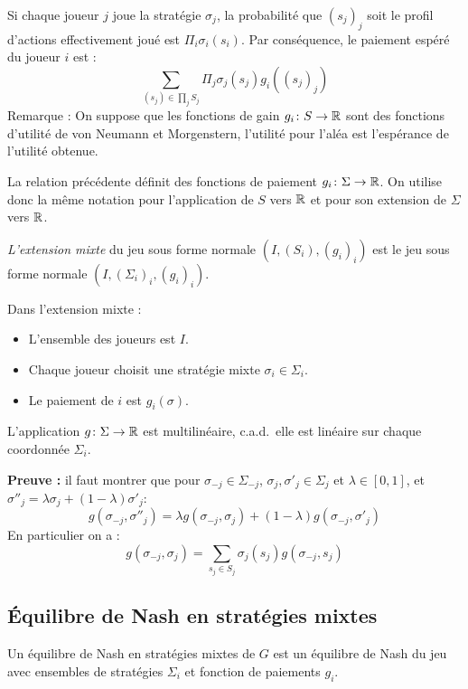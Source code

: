 Si chaque joueur $j$ joue la strat\'egie $\sigma_j$, la
probabilité que $(s_j)_j$ soit le profil d'actions effectivement
joué est $\Pi_i \sigma_i(s_i)$. Par conséquence, le paiement
esp\'er\'e du joueur $i$ est :
$$
\sum_{(s_j)\in \prod_j S_j} \Pi_j \sigma_j(s_j) g_i((s_j)_j)
$$
Remarque : On suppose que les fonctions de gain $g_i\colon
S\to\mathbb R$ sont des fonctions d'utilité de von Neumann et
Morgenstern, l'utilité pour l'aléa est l'espérance de l'utilité
obtenue.

La relation précédente définit des fonctions de paiement
$g_i\colon\Sigma\to\mathbb R$. On utilise donc la même notation pour
l'application de $S$ vers $\mathbb R$ et pour son extension de
$\Sigma$ vers $\mathbb R$.

\begin{definition}
{\em L'extension mixte} du jeu sous forme normale $(I,
(S_i),(g_i)_i)$ est le jeu sous forme normale
$(I,(\Sigma_i)_i,(g_i)_i)$.%
\end{definition}

Dans l'extension mixte :
\begin{itemize}%
\item L'ensemble des joueurs est $I$.%
\item Chaque joueur choisit une stratégie mixte $\sigma_i\in
\Sigma_i$. %
\item Le paiement de $i$ est $g_i(\sigma)$.%
\end{itemize}%


\begin{proposition} L'application $g\colon\Sigma\to\mathbb R$ est multilin\'eaire,
c.a.d.\, elle est lin\'eaire sur chaque coordonn\'ee $\Sigma_i$.
\end{proposition}
{\bf Preuve :} il faut montrer que pour
$\sigma_{-j}\in\Sigma_{-j}$, $\sigma_j, \sigma'_j \in \Sigma_j$ et
$\lambda\in[0,1]$, et $\sigma''_j=\lambda \sigma_j + (1-\lambda)
\sigma'_j$:
$$
g(\sigma_{-j},\sigma''_{j}) = \lambda g(\sigma_{-j},\sigma_{j}) +
(1-\lambda)g(\sigma_{-j},\sigma'_{j})
$$
En particulier on a :
$$
g(\sigma_{-j},\sigma_{j}) = \sum_{s_j\in S_j}
\sigma_j(s_j)g(\sigma_{-j},s_j)
$$

\subsection{Équilibre de Nash en stratégies mixtes}

\begin{definition}
 Un \'equilibre de Nash en strat\'egies mixtes
de $G$ est un \'equilibre de Nash du jeu avec ensembles de
strat\'egies $\Sigma_i$ et fonction de paiements $g_i$.
\end{definition}

